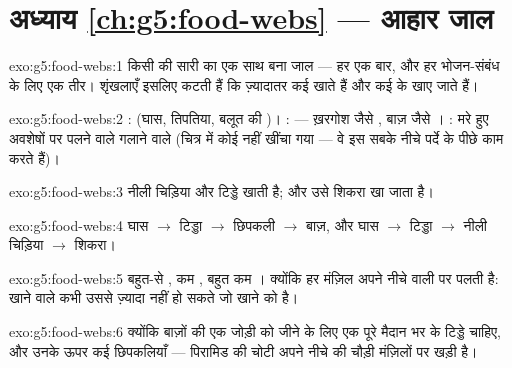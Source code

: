 \section*{अध्याय \ref{ch:g5:food-webs} --- आहार जाल}

\begin{solution}{exo:g5:food-webs:1}
किसी  की सारी  का एक साथ बना जाल --- हर  एक
बार, और हर भोजन-संबंध के लिए एक तीर। शृंखलाएँ इसलिए कटती हैं कि
ज़्यादातर  कई  खाते हैं और कई के खाए जाते हैं।
\end{solution}

\begin{solution}{exo:g5:food-webs:2}
:  (घास, तिपतिया, बलूत की )। :  ---
ख़रगोश जैसे , बाज़ जैसे । : मरे हुए अवशेषों पर
पलने वाले गलाने वाले (चित्र में कोई नहीं खींचा गया --- वे इस सबके नीचे
पर्दे के पीछे काम करते हैं)।
\end{solution}

\begin{solution}{exo:g5:food-webs:3}
नीली चिड़िया  और टिड्डे खाती है; और उसे शिकरा खा जाता है।
\end{solution}

\begin{solution}{exo:g5:food-webs:4}
घास $\rightarrow$ टिड्डा $\rightarrow$ छिपकली
$\rightarrow$ बाज़, और घास $\rightarrow$ टिड्डा
$\rightarrow$ नीली चिड़िया $\rightarrow$ शिकरा।
\end{solution}

\begin{solution}{exo:g5:food-webs:5}
बहुत-से , कम , बहुत कम । क्योंकि हर मंज़िल
अपने नीचे वाली पर पलती है: खाने वाले कभी उससे ज़्यादा नहीं हो सकते जो
खाने को है।
\end{solution}

\begin{solution}{exo:g5:food-webs:6}
क्योंकि बाज़ों की एक जोड़ी को जीने के लिए एक पूरे मैदान भर के टिड्डे
चाहिए, और उनके ऊपर कई छिपकलियाँ --- पिरामिड की चोटी अपने नीचे की चौड़ी
मंज़िलों पर खड़ी है।
\end{solution}

